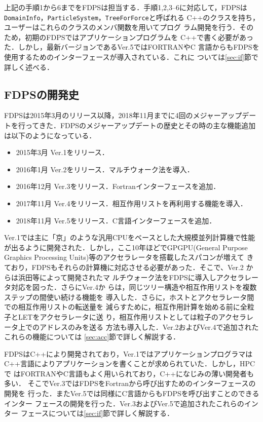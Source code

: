\documentclass[submit]{ipsj}
\begin{document}
上記の手順1から6までをFDPSは担当する．手順1,2,3--6に対応して，FDPSは
{\tt DomainInfo}，{\tt ParticleSystem}，{\tt TreeForForce}と呼ばれる
C++のクラスを持ち，ユーザーはこれらのクラスのメンバ関数を用いてプログ
ラム開発を行う．そのため，初期のFDPSではアプリケーションプログラムを
C++で書く必要があった．しかし，最新バージョンであるVer.5ではFORTRANやC
言語からもFDPSを使用するためのインターフェースが導入されている．これに
ついては\ref{sec:if}節で詳しく述べる．

\subsection{FDPSの開発史}

FDPSは2015年3月のリリース以降，2018年11月までに4回のメジャーアップデー
トを行ってきた．FDPSのメジャーアップデートの歴史とその時の主な機能追加
は以下のようになっている．

\begin{itemize}
\item 2015年3月 Ver.1をリリース．
\item 2016年1月 Ver.2をリリース．マルチウォーク法を導入．
\item 2016年12月 Ver.3をリリース．Fortranインターフェースを追加．
\item 2017年11月 Ver.4をリリース．相互作用リストを再利用する機能を導入．
\item 2018年11月 Ver.5をリリース．C言語インターフェースを追加．
\end{itemize}

Ver.1では主に「京」のような汎用CPUをベースとした大規模並列計算機で性能
が出るように開発された．しかし，ここ10年ほどでGPGPU(General Purpose
Graphics Processing Units)等のアクセラレータを搭載したスパコンが増えて
きており，FDPSもそれらの計算機に対応させる必要があった．そこで、Ver.2
からは浜田等\cite{Hamada:2009:THN:1654059.1654123}によって開発されたマ
ルチウォーク法をFDPSに導入しアクセラレータ対応を図った．さらにVer.4か
らは，同じツリー構造や相互作用リストを複数ステップの間使い続ける機能を
導入した．さらに，ホストとアクセラレータ間での相互作用リストの転送量を
減らすために，相互作用計算を始める前に全粒子とLETをアクセラレータに送
り，相互作用リストとしては粒子のアクセラレータ上でのアドレスのみを送る
方法も導入した．Ver.2およびVer.4で追加されたこれらの機能については
\ref{sec:acc}節で詳しく解説する．

FDPSはC++により開発されており，Ver.1ではアプリケーションプログラマは
C++言語によりアプリケーションを書くことが求められていた．しかし，HPCで
はFORTRANやC言語もよく用いられており，C++になじみの薄い開発者も多い．
そこでVer.3ではFDPSをFortranから呼び出すためのインターフェースの開発を
行った．またVer.5では同様にC言語からもFDPSを呼び出すことのできるインター
フェースの開発を行った．Ver.3およびVer.5で追加されたこれらのインター
フェースについては\ref{sec:if}節で詳しく解説する．
\end{document}
